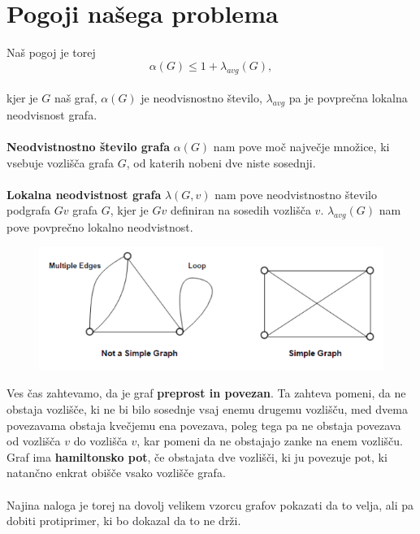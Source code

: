 \documentclass[12pt,a4paper]{amsart}
\theoremstyle{definition} %
\theoremstyle{plain} %
\begin{document}
\section{Pogoji našega problema}
Naš pogoj je torej 
\ \\
$$ \alpha(G) \leq 1 + \lambda_{avg}(G),$$
\ \\
kjer je $G$ naš graf, $\alpha(G)$ je neodvisnostno število, $\lambda_{avg}$ pa je povprečna lokalna neodvisnost grafa.\\
\ \\
\textbf{Neodvistnostno število grafa} $\alpha(G)$ nam pove moč največje množice, ki vsebuje  vozlišča grafa $G$, od katerih nobeni dve niste sosednji.\\
\ \\
\textbf{Lokalna neodvistnost grafa} $\lambda(G, v)$ nam pove neodvistnostno število podgrafa $Gv$ grafa $G$, kjer je $Gv$ definiran na sosedih vozlišča $v$. $\lambda_{avg}(G)$ nam pove povprečno lokalno neodvistnost.\\
\begin{figure}[h]
	\centering

	\includegraphics[scale=1]{slike/graf1}
\end{figure}

Ves čas zahtevamo, da je graf \textbf{preprost in povezan}. Ta zahteva pomeni, da ne obstaja vozlišče, ki ne bi bilo sosednje vsaj enemu drugemu vozlišču,  med dvema povezavama obstaja kvečjemu ena povezava, poleg tega pa ne obstaja  povezava od vozlišča $v$ do vozlišča $v$, kar pomeni da ne obstajajo zanke na enem vozlišču.\\
 
Graf ima \textbf{hamiltonsko pot}, če obstajata dve vozlišči, ki ju povezuje pot, ki natančno enkrat obišče vsako vozlišče grafa.\\
\ \\
Najina naloga je torej na dovolj velikem vzorcu grafov pokazati da to velja, ali pa dobiti protiprimer, ki bo dokazal da to ne drži.\\
\end{document}
